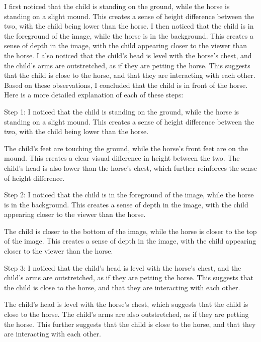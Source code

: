 \begin{enumerate}
        I first noticed that the child is standing on the ground, while the horse is standing on a slight mound. This creates a sense of height difference between the two, with the child being lower than the horse.
        I then noticed that the child is in the foreground of the image, while the horse is in the background. This creates a sense of depth in the image, with the child appearing closer to the viewer than the horse.
        I also noticed that the child's head is level with the horse's chest, and the child's arms are outstretched, as if they are petting the horse. This suggests that the child is close to the horse, and that they are interacting with each other.
        Based on these observations, I concluded that the child is in front of the horse.
        Here is a more detailed explanation of each of these steps:
        
        Step 1: I noticed that the child is standing on the ground, while the horse is standing on a slight mound. This creates a sense of height difference between the two, with the child being lower than the horse.
        
        The child's feet are touching the ground, while the horse's front feet are on the mound. This creates a clear visual difference in height between the two. The child's head is also lower than the horse's chest, which further reinforces the sense of height difference.
        
        Step 2: I noticed that the child is in the foreground of the image, while the horse is in the background. This creates a sense of depth in the image, with the child appearing closer to the viewer than the horse.
        
        The child is closer to the bottom of the image, while the horse is closer to the top of the image. This creates a sense of depth in the image, with the child appearing closer to the viewer than the horse.
        
        Step 3: I noticed that the child's head is level with the horse's chest, and the child's arms are outstretched, as if they are petting the horse. This suggests that the child is close to the horse, and that they are interacting with each other.
        
        The child's head is level with the horse's chest, which suggests that the child is close to the horse. The child's arms are also outstretched, as if they are petting the horse. This further suggests that the child is close to the horse, and that they are interacting with each other.
        

\end{enumerate}
